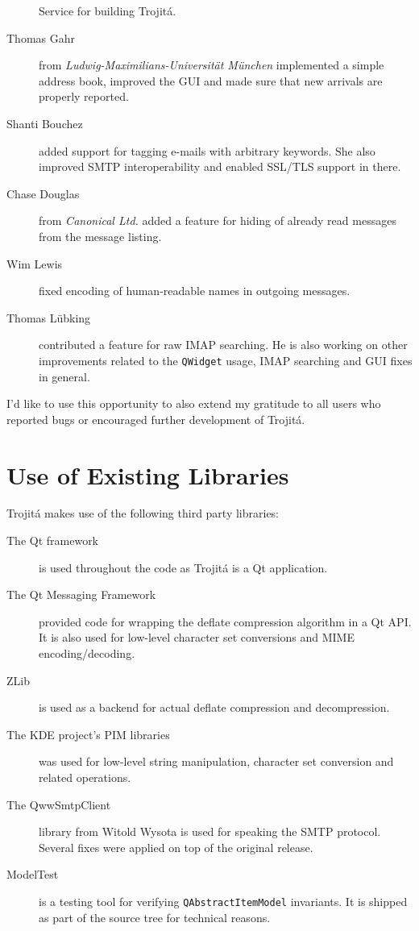 \documentclass[trojita]{subfiles}
\begin{document}
\begin{description}
    Service for building Trojitá.
  \item[Thomas Gahr] from {\em Ludwig-Maximilians-Universität München} implemented a simple address book, improved the
    GUI and made sure that new arrivals are properly reported.
  \item[Shanti Bouchez] added support for tagging e-mails with arbitrary keywords.  She also improved SMTP
    interoperability and enabled SSL/TLS support in there.
  \item[Chase Douglas] from {\em Canonical Ltd.} added a feature for hiding of already read messages from the message
    listing.
  \item[Wim Lewis] fixed encoding of human-readable names in outgoing messages.
  \item[Thomas Lübking] contributed a feature for raw IMAP searching.  He is also working on other improvements related
    to the {\tt QWidget} usage, IMAP searching and GUI fixes in general.
\end{description}

I'd like to use this opportunity to also extend my gratitude to all users who reported bugs or encouraged further
development of Trojitá.

\section{Use of Existing Libraries}

Trojitá makes use of the following third party libraries:

\begin{description}
  \item[The Qt framework] is used throughout the code as Trojitá is a Qt application.
  \item[The Qt Messaging Framework] provided code for wrapping the deflate compression algorithm in a Qt API.  It is
    also used for low-level character set conversions and MIME encoding/decoding.
  \item[ZLib] is used as a backend for actual deflate compression and decompression.
  \item[The KDE project's PIM libraries] was used for low-level string manipulation, character set conversion and
    related operations.
  \item[The QwwSmtpClient] library from Witold Wysota is used for speaking the SMTP protocol.  Several fixes were
    applied on top of the original release.
  \item[ModelTest] is a testing tool for verifying {\tt QAbstractItemModel} invariants. It is shipped as part of the
    source tree for technical reasons.
\end{description}
\end{document}
